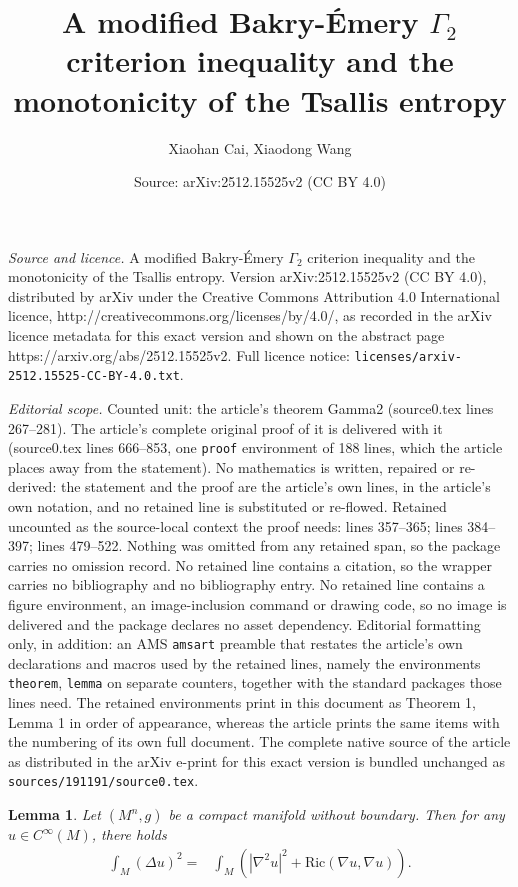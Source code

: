 \documentclass[10pt,a4paper]{amsart}
\title{A modified Bakry-\'Emery $\Gamma_2$ criterion inequality and the monotonicity of the Tsallis entropy}
\author{Xiaohan Cai, Xiaodong Wang}
\date{Source: arXiv:2512.15525v2 (CC BY 4.0)}
\newtheorem{lemma}{Lemma}
\begin{document}
\maketitle

\noindent\emph{Source and licence.} A modified Bakry-\'Emery $\Gamma_2$ criterion inequality and the monotonicity of the Tsallis entropy. Version arXiv:2512.15525v2 (CC BY 4.0), distributed by arXiv under the Creative Commons Attribution 4.0 International licence, http://creativecommons.org/licenses/by/4.0/, as recorded in the arXiv licence metadata for this exact version and shown on the abstract page https://arxiv.org/abs/2512.15525v2. Full licence notice: \texttt{licenses/arxiv-2512.15525-CC-BY-4.0.txt}.\par\smallskip

\noindent\textit{Editorial scope.} Counted unit: the article's theorem Gamma2 (source0.tex lines 267--281). The article's complete original proof of it is delivered with it (source0.tex lines 666--853, one \texttt{proof} environment of 188 lines, which the article places away from the statement). No mathematics is written, repaired or re-derived: the statement and the proof are the article's own lines, in the article's own notation, and no retained line is substituted or re-flowed.  Retained uncounted as the source-local context the proof needs: lines 357--365; lines 384--397; lines 479--522.  Nothing was omitted from any retained span, so the package carries no omission record.  No retained line contains a citation, so the wrapper carries no bibliography and no bibliography entry.  No retained line contains a figure environment, an image-inclusion command or drawing code, so no image is delivered and the package declares no asset dependency.  Editorial formatting only, in addition: an AMS \texttt{amsart} preamble that restates the article's own declarations and macros used by the retained lines, namely the environments \texttt{theorem}, \texttt{lemma} on separate counters, together with the standard packages those lines need.  The retained environments print in this document as Theorem 1, Lemma 1 in order of appearance, whereas the article prints the same items with the numbering of its own full document.  The complete native source of the article as distributed in the arXiv e-print for this exact version is bundled unchanged as \texttt{sources/191191/source0.tex}.
\begin{lemma}\label{lem.laplace squared}
        Let $(M^n,g)$ be a compact manifold without boundary. Then for any $u\in C^{\infty}(M)$, there holds
        \begin{align*}
            \int_M(\Delta u)^2
            =&\int_M
            \left(\left|\nabla^2 u\right|^2
            +\mathrm{Ric}(\nabla u,\nabla u)\right).
        \end{align*}
    \end{lemma}
\end{document}
